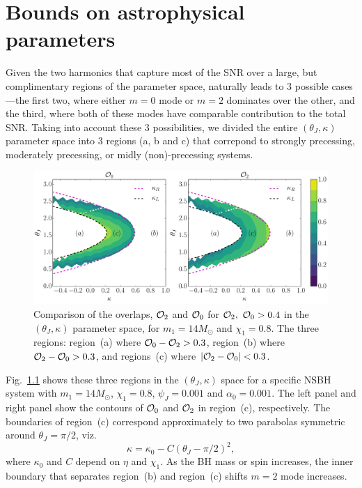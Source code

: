 
\chapter{Bounds on astrophysical parameters}

Given the two harmonics that capture most of the SNR over a large, but
complimentary regions of the parameter space, naturally leads to 3 possible
cases---the first two, where either $m=0$ mode or $m=2$ dominates over the
other, and the third, where both of these modes have comparable contribution
to the total SNR. Taking into account these 3 possibilities, we divided the
entire $(\theta_J, \kappa)$ parameter space into 3 regions (a, b and c) that
correpond to strongly precessing, moderately precessing, or midly
(non)-precessing systems. 

\begin{figure}[!bp]
\centering
\includegraphics[width=0.8\linewidth]{images/OVLP_cut.pdf}
\caption{\small{Comparison of the overlaps, ${\cal{O}}_2$ and ${\cal{O}}_0$
for ${\cal{O}}_2, ~{\cal{O}}_0 > 0.4$ in the $(\theta_J, \kappa)$ parameter
space, for $m_{1}=14M_{\odot}$ and $\chi_1=0.8$. The three regions: region~(a)
where ${\cal{O}}_0 - {\cal{O}}_2 > 0.3$, region~(b) where ${\cal{O}}_2 -
{\cal{O}}_0 > 0.3$, and regions~(c) where $|{\cal{O}}_2-{\cal{O}}_0|< 0.3$.}}
\label{FIG:OVLP_cut_regions}
\end{figure}

Fig.~\ref{FIG:OVLP_cut_regions} shows these three regions
in the $(\theta_J, \kappa)$ space for a specific NSBH system with $m_{1}=14
M_\odot$, $\chi_1=0.8$, $\psi_J=0.001$ and $\alpha_0 =0.001$. The left panel
and right panel show the contours of ${\cal O}_0$ and ${\cal O}_2$ in
region~(c), respectively. The boundaries of region~(c) correspond
approximately to two parabolas symmetric around $\theta_J=\pi/2$, viz.
\begin{equation}
\kappa = \kappa_{0} - C(\theta_J-\pi/2)^2, 
\label{EQ:boundary_region}
\end{equation}
where $\kappa_0$ and $C$ depend on $\eta$ and $\chi_1$. As the BH mass or spin
increases, the inner boundary that separates region~(b) and region~(c) shifts
$m=2$ mode increases.

